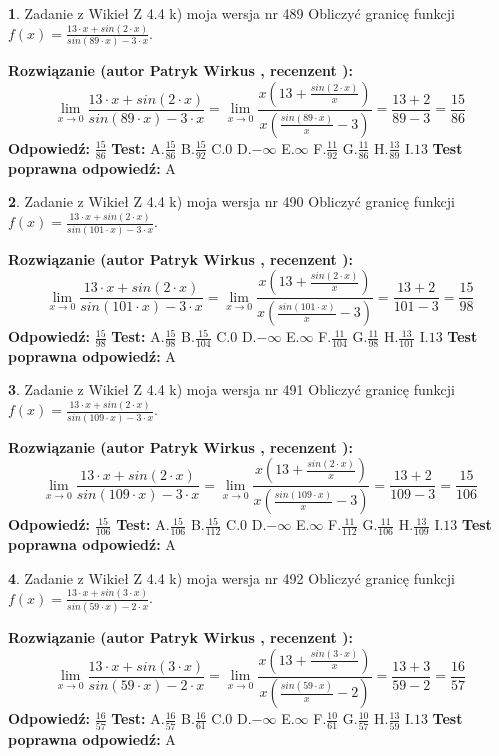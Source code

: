 \documentclass[12pt, a4paper]{article}
\theoremstyle{definition} %
\newtheorem{zad}{}
\newcommand{\zadStart}[1]{\begin{zad}#1\newline}
\newcommand{\zadStop}{\end{zad}}
\newcommand{\rozwStart}[2]{\noindent \textbf{Rozwiązanie (autor #1 , recenzent #2): }\newline}
\newcommand{\rozwStop}{\newline}
\newcommand{\odpStart}{\noindent \textbf{Odpowiedź:}\newline}
\newcommand{\odpStop}{\newline}
\newcommand{\testStart}{\noindent \textbf{Test:}\newline}
\newcommand{\testStop}{\newline}
\newcommand{\kluczStart}{\noindent \textbf{Test poprawna odpowiedź:}\newline}
\newcommand{\kluczStop}{\newline}
\begin{document}
\zadStart{Zadanie z Wikieł Z 4.4 k) moja wersja nr 489}
Obliczyć granicę funkcji $f(x)=\frac{13\cdot x +sin(2\cdot x)}{sin(89\cdot x) -3\cdot x}$.
\zadStop
\rozwStart{Patryk Wirkus}{}
$$\lim\limits_{x\to 0}\frac{13\cdot x +sin(2\cdot x)}{sin(89\cdot x) -3\cdot x}
=\lim\limits_{x\to 0}\frac{x(13+\frac{sin(2\cdot x)}{x})}{x(\frac{sin(89\cdot x)}{x}-3)}
=\frac{13+2}{89-3} = \frac{15}{86}$$
\rozwStop
\odpStart
$\frac{15}{86}$
\odpStop
\testStart
A.$\frac{15}{86}$
B.$\frac{15}{92}$
C.$0$
D.$-\infty$
E.$\infty$
F.$\frac{11}{92}$
G.$\frac{11}{86}$
H.$\frac{13}{89}$
I.$13$
\testStop
\kluczStart
A
\kluczStop



\zadStart{Zadanie z Wikieł Z 4.4 k) moja wersja nr 490}
Obliczyć granicę funkcji $f(x)=\frac{13\cdot x +sin(2\cdot x)}{sin(101\cdot x) -3\cdot x}$.
\zadStop
\rozwStart{Patryk Wirkus}{}
$$\lim\limits_{x\to 0}\frac{13\cdot x +sin(2\cdot x)}{sin(101\cdot x) -3\cdot x}
=\lim\limits_{x\to 0}\frac{x(13+\frac{sin(2\cdot x)}{x})}{x(\frac{sin(101\cdot x)}{x}-3)}
=\frac{13+2}{101-3} = \frac{15}{98}$$
\rozwStop
\odpStart
$\frac{15}{98}$
\odpStop
\testStart
A.$\frac{15}{98}$
B.$\frac{15}{104}$
C.$0$
D.$-\infty$
E.$\infty$
F.$\frac{11}{104}$
G.$\frac{11}{98}$
H.$\frac{13}{101}$
I.$13$
\testStop
\kluczStart
A
\kluczStop



\zadStart{Zadanie z Wikieł Z 4.4 k) moja wersja nr 491}
Obliczyć granicę funkcji $f(x)=\frac{13\cdot x +sin(2\cdot x)}{sin(109\cdot x) -3\cdot x}$.
\zadStop
\rozwStart{Patryk Wirkus}{}
$$\lim\limits_{x\to 0}\frac{13\cdot x +sin(2\cdot x)}{sin(109\cdot x) -3\cdot x}
=\lim\limits_{x\to 0}\frac{x(13+\frac{sin(2\cdot x)}{x})}{x(\frac{sin(109\cdot x)}{x}-3)}
=\frac{13+2}{109-3} = \frac{15}{106}$$
\rozwStop
\odpStart
$\frac{15}{106}$
\odpStop
\testStart
A.$\frac{15}{106}$
B.$\frac{15}{112}$
C.$0$
D.$-\infty$
E.$\infty$
F.$\frac{11}{112}$
G.$\frac{11}{106}$
H.$\frac{13}{109}$
I.$13$
\testStop
\kluczStart
A
\kluczStop



\zadStart{Zadanie z Wikieł Z 4.4 k) moja wersja nr 492}
Obliczyć granicę funkcji $f(x)=\frac{13\cdot x +sin(3\cdot x)}{sin(59\cdot x) -2\cdot x}$.
\zadStop
\rozwStart{Patryk Wirkus}{}
$$\lim\limits_{x\to 0}\frac{13\cdot x +sin(3\cdot x)}{sin(59\cdot x) -2\cdot x}
=\lim\limits_{x\to 0}\frac{x(13+\frac{sin(3\cdot x)}{x})}{x(\frac{sin(59\cdot x)}{x}-2)}
=\frac{13+3}{59-2} = \frac{16}{57}$$
\rozwStop
\odpStart
$\frac{16}{57}$
\odpStop
\testStart
A.$\frac{16}{57}$
B.$\frac{16}{61}$
C.$0$
D.$-\infty$
E.$\infty$
F.$\frac{10}{61}$
G.$\frac{10}{57}$
H.$\frac{13}{59}$
I.$13$
\testStop
\kluczStart
A
\kluczStop
\end{document}
